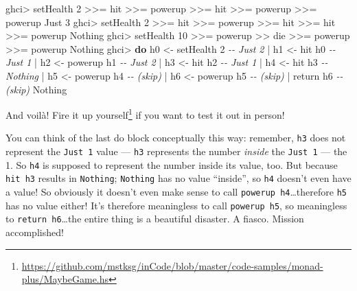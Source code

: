 \documentclass[]{article}
\newenvironment{Shaded}{}{}
\newcommand{\CommentTok}[1]{\textcolor[rgb]{0.38,0.63,0.69}{\textit{#1}}}
\newcommand{\DataTypeTok}[1]{\textcolor[rgb]{0.56,0.13,0.00}{#1}}
\newcommand{\DecValTok}[1]{\textcolor[rgb]{0.25,0.63,0.44}{#1}}
\newcommand{\FunctionTok}[1]{\textcolor[rgb]{0.02,0.16,0.49}{#1}}
\newcommand{\KeywordTok}[1]{\textcolor[rgb]{0.00,0.44,0.13}{\textbf{#1}}}
\newcommand{\NormalTok}[1]{#1}
\newcommand{\OperatorTok}[1]{\textcolor[rgb]{0.40,0.40,0.40}{#1}}
\newcommand{\OtherTok}[1]{\textcolor[rgb]{0.00,0.44,0.13}{#1}}
\renewcommand{\href}[2]{#2\footnote{\url{#1}}}
\begin{document}
\begin{Shaded}
\begin{Highlighting}[]
\NormalTok{ghci}\OperatorTok{>}\NormalTok{ setHealth }\DecValTok{2} \OperatorTok{>>=}\NormalTok{ hit }\OperatorTok{>>=}\NormalTok{ powerup }\OperatorTok{>>=}\NormalTok{ hit }\OperatorTok{>>=}\NormalTok{ powerup }\OperatorTok{>>=}\NormalTok{ powerup}
\DataTypeTok{Just} \DecValTok{3}
\NormalTok{ghci}\OperatorTok{>}\NormalTok{ setHealth }\DecValTok{2} \OperatorTok{>>=}\NormalTok{ hit }\OperatorTok{>>=}\NormalTok{ powerup }\OperatorTok{>>=}\NormalTok{ hit }\OperatorTok{>>=}\NormalTok{ hit }\OperatorTok{>>=}\NormalTok{ powerup}
\DataTypeTok{Nothing}
\NormalTok{ghci}\OperatorTok{>}\NormalTok{ setHealth }\DecValTok{10} \OperatorTok{>>=}\NormalTok{ powerup }\OperatorTok{>>}\NormalTok{ die }\OperatorTok{>>=}\NormalTok{ powerup }\OperatorTok{>>=}\NormalTok{ powerup}
\DataTypeTok{Nothing}
\NormalTok{ghci}\OperatorTok{>} \KeywordTok{do}\NormalTok{  h0 }\OtherTok{<{-}}\NormalTok{ setHealth }\DecValTok{2}        \CommentTok{{-}{-} Just 2}
    \OperatorTok{|}\NormalTok{     h1 }\OtherTok{<{-}}\NormalTok{ hit h0             }\CommentTok{{-}{-} Just 1}
    \OperatorTok{|}\NormalTok{     h2 }\OtherTok{<{-}}\NormalTok{ powerup h1         }\CommentTok{{-}{-} Just 2}
    \OperatorTok{|}\NormalTok{     h3 }\OtherTok{<{-}}\NormalTok{ hit h2             }\CommentTok{{-}{-} Just 1}
    \OperatorTok{|}\NormalTok{     h4 }\OtherTok{<{-}}\NormalTok{ hit h3             }\CommentTok{{-}{-} Nothing}
    \OperatorTok{|}\NormalTok{     h5 }\OtherTok{<{-}}\NormalTok{ powerup h4         }\CommentTok{{-}{-} (skip)}
    \OperatorTok{|}\NormalTok{     h6 }\OtherTok{<{-}}\NormalTok{ powerup h5         }\CommentTok{{-}{-} (skip)}
    \OperatorTok{|}     \FunctionTok{return}\NormalTok{ h6                }\CommentTok{{-}{-} (skip)}
\DataTypeTok{Nothing}
\end{Highlighting}
\end{Shaded}

And voilà!
\href{https://github.com/mstksg/inCode/blob/master/code-samples/monad-plus/MaybeGame.hs}{Fire
it up yourself} if you want to test it out in person!

You can think of the last do block conceptually this way: remember, \texttt{h3}
does not represent the \texttt{Just\ 1} value --- \texttt{h3} represents the
number \emph{inside} the \texttt{Just\ 1} --- the 1. So \texttt{h4} is supposed
to represent the number inside its value, too. But because \texttt{hit\ h3}
results in \texttt{Nothing}; \texttt{Nothing} has no value ``inside'', so
\texttt{h4} doesn't even have a value! So obviously it doesn't even make sense
to call \texttt{powerup\ h4}\ldots therefore \texttt{h5} has no value either!
It's therefore meaningless to call \texttt{powerup\ h5}, so meaningless to
\texttt{return\ h6}\ldots the entire thing is a beautiful disaster. A fiasco.
Mission accomplished!
\end{document}
